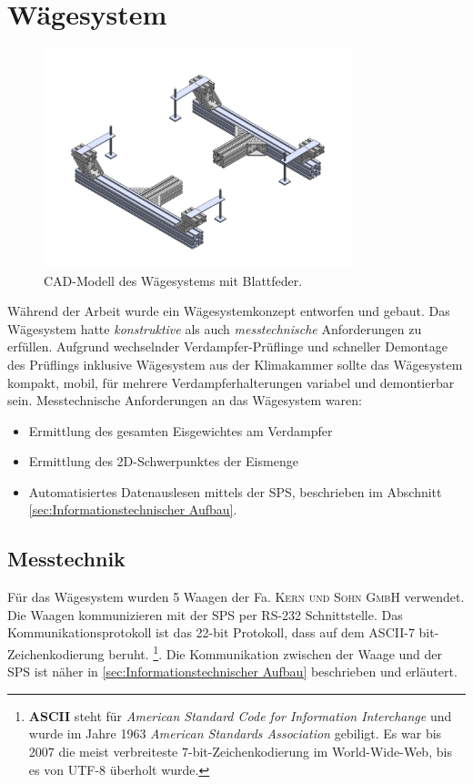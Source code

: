 
\section{Wägesystem}
\label{sec:Waegesystem}

\begin{figure}[htb]
\centering		\includegraphics[width=0.80\textwidth]{Pictures/Waage_2Ansichten.pdf}
\caption{CAD-Modell des Wägesystems mit Blattfeder.}
\label{fig:}
\end{figure}

Während der Arbeit wurde ein Wägesystemkonzept entworfen und gebaut. Das Wägesystem hatte \textit{konstruktive} als auch \textit{messtechnische} Anforderungen zu erfüllen. Aufgrund wechselnder Verdampfer-Prüflinge und schneller Demontage des Prüflings inklusive Wägesystem aus der Klimakammer sollte das Wägesystem  kompakt, mobil, für mehrere Verdampferhalterungen variabel und demontierbar sein. 
Messtechnische Anforderungen an das Wägesystem waren:

\begin{itemize}
\item Ermittlung des gesamten Eisgewichtes am Verdampfer
\item Ermittlung des 2D-Schwerpunktes der Eismenge
\item Automatisiertes Datenauslesen mittels der SPS, beschrieben im Abschnitt \ref{sec:Informationstechnischer Aufbau}.
\end{itemize}

\subsection{Messtechnik}
\label{subsec:Waagen-Messtechnik}

Für das Wägesystem wurden 5 Waagen der Fa. \textsc{Kern und Sohn GmbH} verwendet. Die Waagen kommunizieren mit der SPS per RS-232 Schnittstelle. Das Kommunikationsprotokoll ist das 22-bit Protokoll, dass auf dem \textsc{ASCII}-7 bit- Zeichenkodierung beruht. \footnote{\textbf{ASCII} steht für \textit{American Standard Code for Information Interchange} und wurde im Jahre 1963  \textit{American Standards Association} gebiligt. Es war bis 2007 die meist verbreiteste 7-bit-Zeichenkodierung im World-Wide-Web, bis es von UTF-8 überholt wurde.}. Die Kommunikation zwischen der Waage und der SPS ist näher in \ref{sec:Informationstechnischer Aufbau} beschrieben und erläutert.

